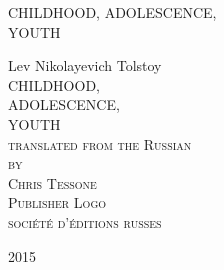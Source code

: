 
\newlength{\drop}\setlength{\drop}{0.12\textheight}

\newcommand*{\firsttitle}{\begingroup
\centering
\vspace*{3em}
{\huge CHILDHOOD, ADOLESCENCE,}\\[\baselineskip]
{\huge YOUTH}
\vfill\null
\endgroup}

\newcommand*{\titleAM}{\begingroup
\centering
\vspace*{\drop}
{\large Lev Nikolayevich Tolstoy}\\[\baselineskip]
{\Huge CHILDHOOD,}\\[\baselineskip]
{\Huge ADOLESCENCE,}\\[\baselineskip]
{\Huge YOUTH}\\[\baselineskip]
{\scshape translated from the Russian}\\
{\scshape by}\\
{\scshape Chris Tessone}\\[\drop]
{\scshape Publisher Logo}\\[0.5\baselineskip]
{\small\scshape soci\'et\'e d'\'editions russes}\par
{\small\scshape 2015}\par
\vfill\null
\endgroup}

\firsttitle
\thispagestyle{empty}
\clearpage

\newpage\null\thispagestyle{empty}\newpage

\titleAM
\thispagestyle{empty}
\clearpage 

